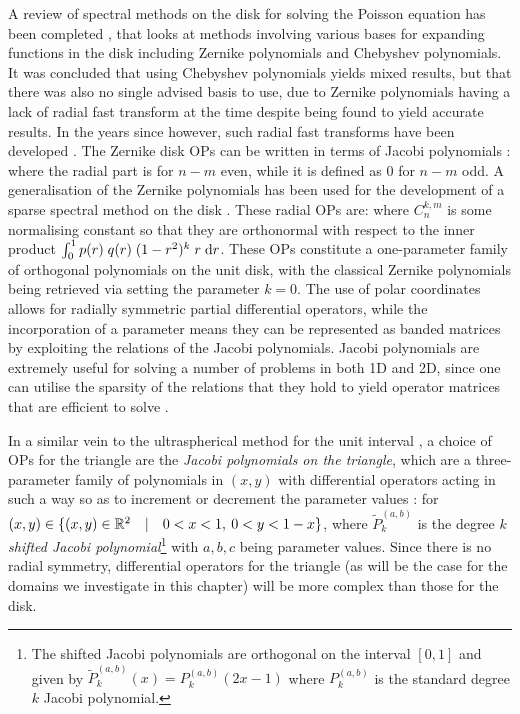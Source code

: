 A review of spectral methods on the disk for solving the Poisson equation has been completed \cite{boyd2011comparing}, that looks at methods involving various bases for expanding functions in the disk including Zernike polynomials and Chebyshev polynomials. It was concluded that using Chebyshev polynomials yields mixed results, but that there was also no single advised basis to use, due to Zernike polynomials having a lack of radial fast transform at the time despite being found to yield accurate results. In the years since however, such radial fast transforms have been developed \cite{slevinsky2018use, sakai2009application, wilber2017computing}. The Zernike disk OPs can be written in terms of Jacobi polynomials \cite{boyd2011comparing}:
where the radial part is
for $n - m$ even, while it is defined as $0$ for $n - m$ odd. A generalisation of the Zernike polynomials has been used for the development of a sparse spectral method on the disk \cite{vasil2016tensor}. These radial OPs are:
where $C_n^{k,m}$ is some normalising constant so that they are orthonormal with respect to the inner product $\int_0^1 p(r) \; q(r) \; (1-r^2)^k \; r \; {\rm d} r$. These OPs constitute a one-parameter family of orthogonal polynomials on the unit disk, with the classical Zernike polynomials being retrieved via setting the parameter $k = 0$. The use of polar coordinates allows for radially symmetric partial differential operators, while the incorporation of a parameter means they can be represented as banded matrices by exploiting the relations of the Jacobi polynomials. Jacobi polynomials are extremely useful for solving a number of problems in both 1D and 2D, since one can utilise the sparsity of the relations that they hold to yield operator matrices that are efficient to solve \cite{doha2006efficient}.

In a similar vein to the ultraspherical method for the unit interval \cite{olver2013fast, doha2009efficient}, a choice of OPs for the triangle are the \textit{Jacobi polynomials on the triangle}, which are a three-parameter family of polynomials in $(x,y)$ with differential operators acting in such a way so as to increment or decrement the parameter values \cite{dunkl2014orthogonal, koornwinder1975two, olver2019triangle}:
for $(x,y) \in \{ (x,y) \in \mathbb{R}^2 \quad | \quad 0 < x < 1, \: 0 < y < 1-x \}$, where $\tilde P_k^{(a,b)}$ is the degree $k$ \textit{shifted Jacobi polynomial}\footnote{The shifted Jacobi polynomials are orthogonal on the interval $[0,1]$ and given by $\tilde P_k^{(a,b)}(x) = P_k^{(a,b)}(2x - 1)$ where $P_k^{(a,b)}$ is the standard degree $k$ Jacobi polynomial.} with $a,b,c$ being parameter values. Since there is no radial symmetry, differential operators for the triangle (as will be the case for the domains we investigate in this chapter) will be more complex than those for the disk.

